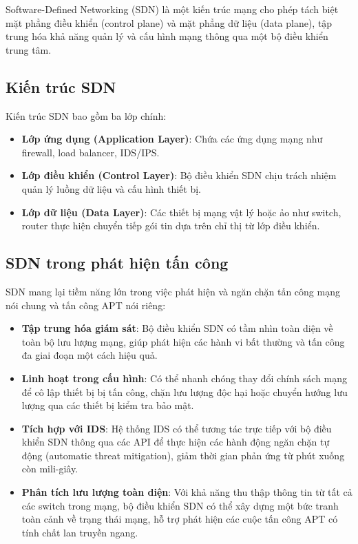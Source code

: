 Software-Defined Networking (SDN) là một kiến trúc mạng cho phép tách biệt mặt phẳng điều khiển (control plane) và mặt phẳng dữ liệu (data plane), tập trung hóa khả năng quản lý và cấu hình mạng thông qua một bộ điều khiển trung tâm.

\subsection{Kiến trúc SDN}
Kiến trúc SDN bao gồm ba lớp chính:
\begin{itemize}
    \item \textbf{Lớp ứng dụng (Application Layer)}: Chứa các ứng dụng mạng như firewall, load balancer, IDS/IPS.
    \item \textbf{Lớp điều khiển (Control Layer)}: Bộ điều khiển SDN chịu trách nhiệm quản lý luồng dữ liệu và cấu hình thiết bị.
    \item \textbf{Lớp dữ liệu (Data Layer)}: Các thiết bị mạng vật lý hoặc ảo như switch, router thực hiện chuyển tiếp gói tin dựa trên chỉ thị từ lớp điều khiển.
\end{itemize}

\subsection{SDN trong phát hiện tấn công}
SDN mang lại tiềm năng lớn trong việc phát hiện và ngăn chặn tấn công mạng nói chung và tấn công APT nói riêng:
\begin{itemize}
    \item \textbf{Tập trung hóa giám sát}: Bộ điều khiển SDN có tầm nhìn toàn diện về toàn bộ lưu lượng mạng, giúp phát hiện các hành vi bất thường và tấn công đa giai đoạn một cách hiệu quả.
    \item \textbf{Linh hoạt trong cấu hình}: Có thể nhanh chóng thay đổi chính sách mạng để cô lập thiết bị bị tấn công, chặn lưu lượng độc hại hoặc chuyển hướng lưu lượng qua các thiết bị kiểm tra bảo mật.
    \item \textbf{Tích hợp với IDS}: Hệ thống IDS có thể tương tác trực tiếp với bộ điều khiển SDN thông qua các API để thực hiện các hành động ngăn chặn tự động (automatic threat mitigation), giảm thời gian phản ứng từ phút xuống còn mili-giây.
    \item \textbf{Phân tích lưu lượng toàn diện}: Với khả năng thu thập thông tin từ tất cả các switch trong mạng, bộ điều khiển SDN có thể xây dựng một bức tranh toàn cảnh về trạng thái mạng, hỗ trợ phát hiện các cuộc tấn công APT có tính chất lan truyền ngang.
\end{itemize}


